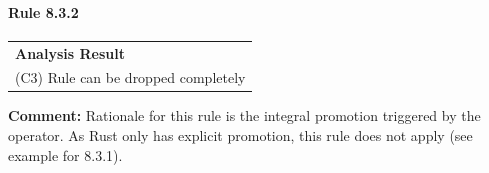 \paragraph{Rule 8.3.2}
\begin{longtable}{p{13cm}}
\textbf{Analysis Result} \\
(C3) Rule can be dropped completely \\
\end{longtable}
\textbf{Comment:} Rationale for this rule is the integral promotion triggered by the operator. As Rust only has explicit promotion, this rule does not apply (see example for 8.3.1). \\
